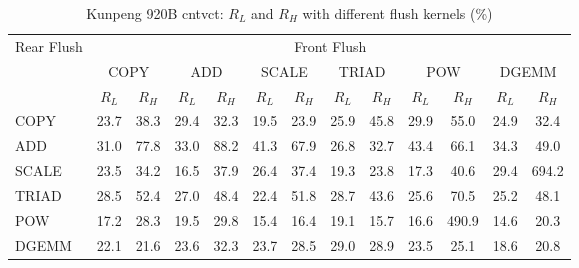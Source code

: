 \begin{table}[htbp]
\centering
\caption{Kunpeng 920B cntvct: $R_L$ and $R_H$ with different flush kernels (\%)}
\label{tab:frkern-c920bn3-cntvct}
\begin{tabular*}{\textwidth}{@{\extracolsep{\fill}}lcccccccccccc}
\toprule
\multirow{3}{*}{Rear Flush} & \multicolumn{12}{c}{Front Flush} \\ \cmidrule(lr){2-13}
& \multicolumn{2}{c}{COPY} & \multicolumn{2}{c}{ADD} & \multicolumn{2}{c}{SCALE} & \multicolumn{2}{c}{TRIAD} & \multicolumn{2}{c}{POW} & \multicolumn{2}{c}{DGEMM} \\ \cmidrule(lr){2-3} \cmidrule(lr){4-5} \cmidrule(lr){6-7} \cmidrule(lr){8-9} \cmidrule(lr){10-11} \cmidrule(lr){12-13}
& $R_L$ & $R_H$ & $R_L$ & $R_H$ & $R_L$ & $R_H$ & $R_L$ & $R_H$ & $R_L$ & $R_H$ & $R_L$ & $R_H$ \\ \midrule
COPY & 23.7 & 38.3 & 29.4 & 32.3 & 19.5 & 23.9 & 25.9 & 45.8 & 29.9 & 55.0 & 24.9 & 32.4 \\
ADD & 31.0 & 77.8 & 33.0 & 88.2 & 41.3 & 67.9 & 26.8 & 32.7 & 43.4 & 66.1 & 34.3 & 49.0 \\
SCALE & 23.5 & 34.2 & 16.5 & 37.9 & 26.4 & 37.4 & 19.3 & 23.8 & 17.3 & 40.6 & 29.4 & 694.2 \\
TRIAD & 28.5 & 52.4 & 27.0 & 48.4 & 22.4 & 51.8 & 28.7 & 43.6 & 25.6 & 70.5 & 25.2 & 48.1 \\
POW & 17.2 & 28.3 & 19.5 & 29.8 & 15.4 & 16.4 & 19.1 & 15.7 & 16.6 & 490.9 & 14.6 & 20.3 \\
DGEMM & 22.1 & 21.6 & 23.6 & 32.3 & 23.7 & 28.5 & 29.0 & 28.9 & 23.5 & 25.1 & 18.6 & 20.8 \\
\bottomrule
\end{tabular*}
\end{table}
